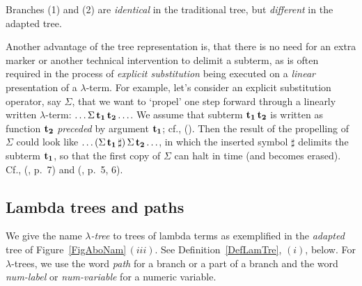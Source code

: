 \documentclass[submission,copyright,creativecommons]{eptcs}
\begin{document}
\begin{Note}\label{NotAboIde}
Branches (1) and (2) are {\em identical\/} in the traditional tree, but {\em different\/} in the adapted tree.
\end{Note}

\begin{Note}\label{NotAboExp}
Another advantage of the tree representation is, that there is no need for an extra marker or another technical intervention to delimit a subterm, as is often required in the process of {\em explicit substitution} being executed on a {\em linear} presentation of a $\lambda$-term. For example, let's consider an explicit substitution operator, say $\Sigma$, that we want to `propel' one step forward through a linearly written \mbox{$\lambda$-term}: $\ldots \Sigma\,{\bf t_1}\, {\bf t_2} \ldots$. We assume that subterm ${\bf t_1}\,{\bf t_2}$ is written as function $\bf t_2$ {\em preceded\/} by argument $\bf t_1$; cf., (\cite{deB72}). Then the result of the propelling of $\Sigma$ could look like $\ldots  ({\Sigma \, \bf t_1 \,\sharp}) {\, \Sigma\, \bf t_2} \ldots$, in which the inserted symbol $\sharp$ delimits the subterm $\bf t_1$, so that the first copy of $\Sigma$ can halt in time (and becomes erased).
Cf., (\cite{Ned79}, p.\ 7) and (\cite{Ned80}, p.\ 5, 6).
\end{Note}
 


\subsection{Lambda trees and paths}\label{SecLam}

We give the name {\em $\lambda$-tree\/} to trees of lambda terms as exemplified in the {\em adapted\/} tree of Figure~\ref{FigAboNam}\,$(iii)$. See Definition~\ref{DefLamTre}, $(i)$, below. For $\lambda$-trees, we use the word {\em path\/} for a branch or a part of a branch and the word {\em num{\rm -}label\/} or {\em num{\rm -}variable\/} for a numeric variable.

\end{document}
